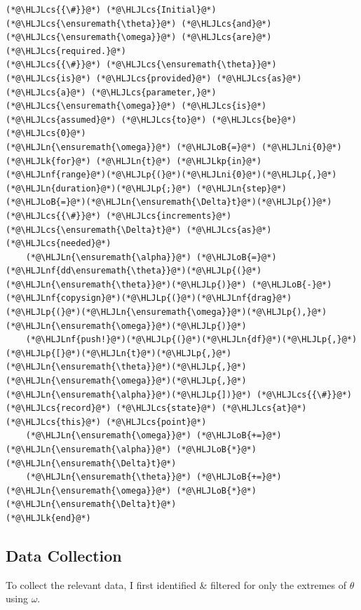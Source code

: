 \documentclass[12pt,a4paper]{article}
\newcommand{\HLJLk}[1]{\textcolor[RGB]{148,91,176}{\textbf{#1}}}
\newcommand{\HLJLkp}[1]{\textcolor[RGB]{148,91,176}{\textbf{#1}}}
\newcommand{\HLJLn}[1]{#1}
\newcommand{\HLJLnf}[1]{\textcolor[RGB]{66,102,213}{#1}}
\newcommand{\HLJLni}[1]{\textcolor[RGB]{59,151,46}{#1}}
\newcommand{\HLJLoB}[1]{\textcolor[RGB]{102,102,102}{\textbf{#1}}}
\newcommand{\HLJLp}[1]{#1}
\newcommand{\HLJLcs}[1]{\textcolor[RGB]{153,153,119}{\textit{#1}}}
\begin{document}
\begin{lstlisting}
(*@\HLJLcs{{\#}}@*) (*@\HLJLcs{Initial}@*) (*@\HLJLcs{\ensuremath{\theta}}@*) (*@\HLJLcs{and}@*) (*@\HLJLcs{\ensuremath{\omega}}@*) (*@\HLJLcs{are}@*) (*@\HLJLcs{required.}@*)
(*@\HLJLcs{{\#}}@*) (*@\HLJLcs{\ensuremath{\theta}}@*) (*@\HLJLcs{is}@*) (*@\HLJLcs{provided}@*) (*@\HLJLcs{as}@*) (*@\HLJLcs{a}@*) (*@\HLJLcs{parameter,}@*) (*@\HLJLcs{\ensuremath{\omega}}@*) (*@\HLJLcs{is}@*) (*@\HLJLcs{assumed}@*) (*@\HLJLcs{to}@*) (*@\HLJLcs{be}@*) (*@\HLJLcs{0}@*)
(*@\HLJLn{\ensuremath{\omega}}@*) (*@\HLJLoB{=}@*) (*@\HLJLni{0}@*)
(*@\HLJLk{for}@*) (*@\HLJLn{t}@*) (*@\HLJLkp{in}@*) (*@\HLJLnf{range}@*)(*@\HLJLp{(}@*)(*@\HLJLni{0}@*)(*@\HLJLp{,}@*) (*@\HLJLn{duration}@*)(*@\HLJLp{;}@*) (*@\HLJLn{step}@*)(*@\HLJLoB{=}@*)(*@\HLJLn{\ensuremath{\Delta}t}@*)(*@\HLJLp{)}@*) (*@\HLJLcs{{\#}}@*) (*@\HLJLcs{increments}@*) (*@\HLJLcs{\ensuremath{\Delta}t}@*) (*@\HLJLcs{as}@*) (*@\HLJLcs{needed}@*)
    (*@\HLJLn{\ensuremath{\alpha}}@*) (*@\HLJLoB{=}@*) (*@\HLJLnf{dd\ensuremath{\theta}}@*)(*@\HLJLp{(}@*)(*@\HLJLn{\ensuremath{\theta}}@*)(*@\HLJLp{)}@*) (*@\HLJLoB{-}@*) (*@\HLJLnf{copysign}@*)(*@\HLJLp{(}@*)(*@\HLJLnf{drag}@*)(*@\HLJLp{(}@*)(*@\HLJLn{\ensuremath{\omega}}@*)(*@\HLJLp{),}@*) (*@\HLJLn{\ensuremath{\omega}}@*)(*@\HLJLp{)}@*)
    (*@\HLJLnf{push!}@*)(*@\HLJLp{(}@*)(*@\HLJLn{df}@*)(*@\HLJLp{,}@*) (*@\HLJLp{[}@*)(*@\HLJLn{t}@*)(*@\HLJLp{,}@*) (*@\HLJLn{\ensuremath{\theta}}@*)(*@\HLJLp{,}@*) (*@\HLJLn{\ensuremath{\omega}}@*)(*@\HLJLp{,}@*) (*@\HLJLn{\ensuremath{\alpha}}@*)(*@\HLJLp{])}@*) (*@\HLJLcs{{\#}}@*) (*@\HLJLcs{record}@*) (*@\HLJLcs{state}@*) (*@\HLJLcs{at}@*) (*@\HLJLcs{this}@*) (*@\HLJLcs{point}@*)
    (*@\HLJLn{\ensuremath{\omega}}@*) (*@\HLJLoB{+=}@*) (*@\HLJLn{\ensuremath{\alpha}}@*) (*@\HLJLoB{*}@*) (*@\HLJLn{\ensuremath{\Delta}t}@*)
    (*@\HLJLn{\ensuremath{\theta}}@*) (*@\HLJLoB{+=}@*) (*@\HLJLn{\ensuremath{\omega}}@*) (*@\HLJLoB{*}@*) (*@\HLJLn{\ensuremath{\Delta}t}@*)
(*@\HLJLk{end}@*)
\end{lstlisting}

\subsection{Data Collection}
To collect the relevant data, I first identified \& filtered for only the extremes of $\theta$ using $\omega$.
\end{document}
